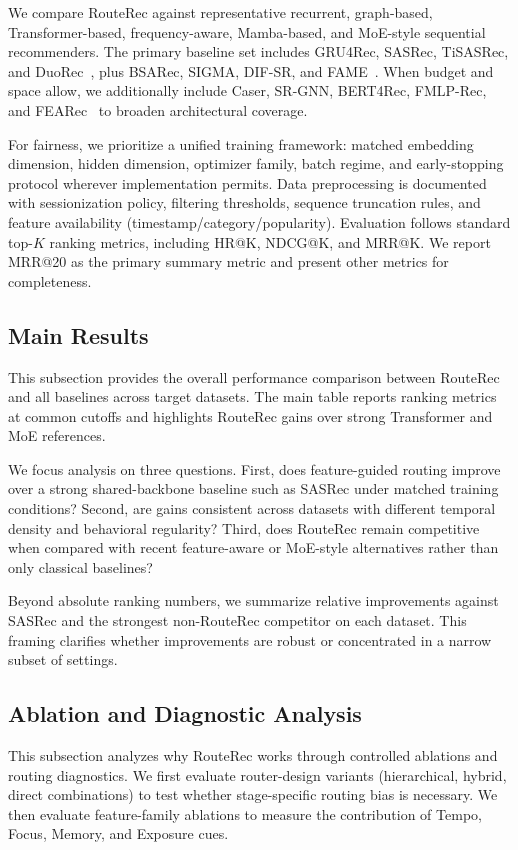 \documentclass[sigconf,anonymous,review]{acmart-primary/acmart}
\begin{document}
We compare RouteRec against representative recurrent, graph-based, Transformer-based, frequency-aware, Mamba-based, and MoE-style sequential recommenders. The primary baseline set includes GRU4Rec, SASRec, TiSASRec, and DuoRec~\cite{hidasi2016gru4rec,kang2018sasrec,li2020tisasrec,qiu2022duorec}, plus BSARec, SIGMA, DIF-SR, and FAME~\cite{shin2024bsarec,liu2025sigma,xie2022difsr,liu2025fame}. When budget and space allow, we additionally include Caser, SR-GNN, BERT4Rec, FMLP-Rec, and FEARec~\cite{tang2018caser,wu2019srgnn,sun2019bert4rec,zhou2022fmlprec,du2023fearec} to broaden architectural coverage.

For fairness, we prioritize a unified training framework: matched embedding dimension, hidden dimension, optimizer family, batch regime, and early-stopping protocol wherever implementation permits. Data preprocessing is documented with sessionization policy, filtering thresholds, sequence truncation rules, and feature availability (timestamp/category/popularity). Evaluation follows standard top-$K$ ranking metrics, including HR@K, NDCG@K, and MRR@K. We report MRR@20 as the primary summary metric and present other metrics for completeness.

\subsection{Main Results}
This subsection provides the overall performance comparison between RouteRec and all baselines across target datasets. The main table reports ranking metrics at common cutoffs and highlights RouteRec gains over strong Transformer and MoE references.

We focus analysis on three questions. First, does feature-guided routing improve over a strong shared-backbone baseline such as SASRec under matched training conditions? Second, are gains consistent across datasets with different temporal density and behavioral regularity? Third, does RouteRec remain competitive when compared with recent feature-aware or MoE-style alternatives rather than only classical baselines?

Beyond absolute ranking numbers, we summarize relative improvements against SASRec and the strongest non-RouteRec competitor on each dataset. This framing clarifies whether improvements are robust or concentrated in a narrow subset of settings.

\subsection{Ablation and Diagnostic Analysis}
This subsection analyzes why RouteRec works through controlled ablations and routing diagnostics. We first evaluate router-design variants (hierarchical, hybrid, direct combinations) to test whether stage-specific routing bias is necessary. We then evaluate feature-family ablations to measure the contribution of Tempo, Focus, Memory, and Exposure cues.
\end{document}

